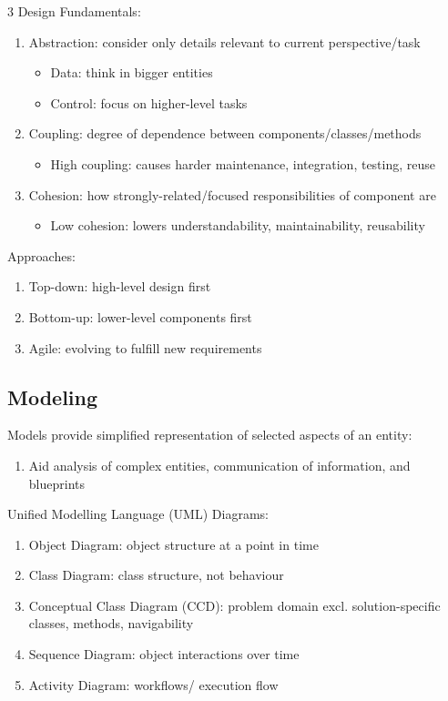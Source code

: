 \documentclass[12pt, a4paper]{article}
\begin{document}
\begin{multicols*}{3}
Design Fundamentals:
\begin{enumerate}[\roman*.]
  \item Abstraction: consider only details relevant to current perspective/task
    \begin{itemize}[leftmargin=*]\vspace{3pt}
      \item Data: think in bigger entities
      \item Control: focus on higher-level tasks
    \end{itemize}
  \item Coupling: degree of dependence between components/classes/methods
    \begin{itemize}[leftmargin=*]\vspace{3pt}
      \item High coupling: causes harder maintenance, integration, testing, reuse
    \end{itemize}
  \item Cohesion: how strongly-related/focused responsibilities of component are
    \begin{itemize}[leftmargin=*]\vspace{3pt}
      \item Low cohesion: lowers understandability, maintainability, reusability
    \end{itemize}
\end{enumerate}

Approaches:
\begin{enumerate}[\roman*.]
  \item Top-down: high-level design first 
  \item Bottom-up: lower-level components first
  \item Agile: evolving to fulfill new requirements
\end{enumerate}

\subsection{Modeling}
Models provide simplified representation of selected aspects of an entity:
\begin{enumerate}[\roman*.]
  \item Aid analysis of complex entities, communication of information, and blueprints
\end{enumerate}

Unified Modelling Language (UML) Diagrams:
\begin{enumerate}[\roman*.]
  \item Object Diagram: object structure at a point in time
  \item Class Diagram: class structure, not behaviour
  \item Conceptual Class Diagram (CCD): problem domain excl. solution-specific classes, methods, navigability
  \item Sequence Diagram: object interactions over time
  \item Activity Diagram: workflows/ execution flow
\end{enumerate}
\vspace{-1em}
\colbreak

\end{multicols*}
\end{document}
